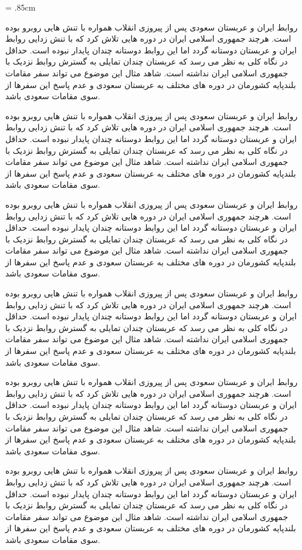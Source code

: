 \documentclass{memoir}
\begin{document}
\baselineskip = .85cm

روابط ایران و عربستان سعودی پس از پیروزی انقلاب همواره با تنش هایی روبرو بوده است. هرچند جمهوری اسلامی ایران در دوره هایی تلاش کرد که با تنش زدایی روابط ایران و عربستان دوستانه گردد اما این روابط دوستانه چندان پایدار نبوده است. حداقل در نگاه کلی به نظر می رسد که عربستان چندان تمایلی به گسترش روابط نزدیک با جمهوری اسلامی ایران نداشته است. شاهد مثال این موضوع می تواند سفر مقامات بلندپایه کشورمان در دوره های مختلف به عربستان سعودی و عدم پاسخ این سفرها از سوی مقامات سعودی باشد.

روابط ایران و عربستان سعودی پس از پیروزی انقلاب همواره با تنش هایی روبرو بوده است. هرچند جمهوری اسلامی ایران در دوره هایی تلاش کرد که با تنش زدایی روابط ایران و عربستان دوستانه گردد اما این روابط دوستانه چندان پایدار نبوده است. حداقل در نگاه کلی به نظر می رسد که عربستان چندان تمایلی به گسترش روابط نزدیک با جمهوری اسلامی ایران نداشته است. شاهد مثال این موضوع می تواند سفر مقامات بلندپایه کشورمان در دوره های مختلف به عربستان سعودی و عدم پاسخ این سفرها از سوی مقامات سعودی باشد.

روابط ایران و عربستان سعودی پس از پیروزی انقلاب همواره با تنش هایی روبرو بوده است. هرچند جمهوری اسلامی ایران در دوره هایی تلاش کرد که با تنش زدایی روابط ایران و عربستان دوستانه گردد اما این روابط دوستانه چندان پایدار نبوده است. حداقل در نگاه کلی به نظر می رسد که عربستان چندان تمایلی به گسترش روابط نزدیک با جمهوری اسلامی ایران نداشته است. شاهد مثال این موضوع می تواند سفر مقامات بلندپایه کشورمان در دوره های مختلف به عربستان سعودی و عدم پاسخ این سفرها از سوی مقامات سعودی باشد.

روابط ایران و عربستان سعودی پس از پیروزی انقلاب همواره با تنش هایی روبرو بوده است. هرچند جمهوری اسلامی ایران در دوره هایی تلاش کرد که با تنش زدایی روابط ایران و عربستان دوستانه گردد اما این روابط دوستانه چندان پایدار نبوده است. حداقل در نگاه کلی به نظر می رسد که عربستان چندان تمایلی به گسترش روابط نزدیک با جمهوری اسلامی ایران نداشته است. شاهد مثال این موضوع می تواند سفر مقامات بلندپایه کشورمان در دوره های مختلف به عربستان سعودی و عدم پاسخ این سفرها از سوی مقامات سعودی باشد.

روابط ایران و عربستان سعودی پس از پیروزی انقلاب همواره با تنش هایی روبرو بوده است. هرچند جمهوری اسلامی ایران در دوره هایی تلاش کرد که با تنش زدایی روابط ایران و عربستان دوستانه گردد اما این روابط دوستانه چندان پایدار نبوده است. حداقل در نگاه کلی به نظر می رسد که عربستان چندان تمایلی به گسترش روابط نزدیک با جمهوری اسلامی ایران نداشته است. شاهد مثال این موضوع می تواند سفر مقامات بلندپایه کشورمان در دوره های مختلف به عربستان سعودی و عدم پاسخ این سفرها از سوی مقامات سعودی باشد.

روابط ایران و عربستان سعودی پس از پیروزی انقلاب همواره با تنش هایی روبرو بوده است. هرچند جمهوری اسلامی ایران در دوره هایی تلاش کرد که با تنش زدایی روابط ایران و عربستان دوستانه گردد اما این روابط دوستانه چندان پایدار نبوده است. حداقل در نگاه کلی به نظر می رسد که عربستان چندان تمایلی به گسترش روابط نزدیک با جمهوری اسلامی ایران نداشته است. شاهد مثال این موضوع می تواند سفر مقامات بلندپایه کشورمان در دوره های مختلف به عربستان سعودی و عدم پاسخ این سفرها از سوی مقامات سعودی باشد.


\printpagenotes
\end{document}
